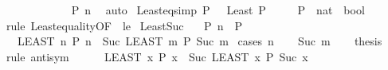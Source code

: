 \begin{isabellebody}
\ \ \ \ \isamarkupfalse%
\isanewline
\ \ \isamarkupfalse%
\isanewline
\ \ \isamarkupfalse%
\ \isamarkupfalse%
\ {\isachardoublequoteopen}P\ n{\isachardoublequoteclose}\ \isamarkupfalse%
\ auto\isanewline
{}\isamarkupfalse%
%
\endisatagproof
{\isafoldproof}%
%
\isadelimproof
\isanewline
%
\endisadelimproof
\isanewline
\isanewline
{}\isamarkupfalse%
\ Least{\isacharunderscore}{\kern0pt}eq{\isacharunderscore}{\kern0pt}{}{\isacharbrackleft}{\kern0pt}simp{\isacharbrackright}{\kern0pt}{\isacharcolon}{\kern0pt}\ {\isachardoublequoteopen}P\ {}\ {\isasymLongrightarrow}\ Least\ P\ {\isacharequal}{\kern0pt}\ {}{\isachardoublequoteclose}\isanewline
\ \ \ P\ {\isacharcolon}{\kern0pt}{\isacharcolon}{\kern0pt}\ {\isachardoublequoteopen}nat\ {\isasymRightarrow}\ bool{\isachardoublequoteclose}\isanewline
%
\isadelimproof
\ \ %
\endisadelimproof
%
\isatagproof
{}\isamarkupfalse%
\ {\isacharparenleft}{\kern0pt}rule\ Least{\isacharunderscore}{\kern0pt}equality{\isacharbrackleft}{\kern0pt}OF\ {\isacharunderscore}{\kern0pt}\ le{}{\isacharbrackright}{\kern0pt}{\isacharparenright}{\kern0pt}%
\endisatagproof
{\isafoldproof}%
%
\isadelimproof
\isanewline
%
\endisadelimproof
\isanewline
{}\isamarkupfalse%
\ Least{\isacharunderscore}{\kern0pt}Suc{\isacharcolon}{\kern0pt}\isanewline
\ \ \ {\isachardoublequoteopen}P\ n{\isachardoublequoteclose}\ {\isachardoublequoteopen}{\isasymnot}\ P\ {}{\isachardoublequoteclose}\ \isanewline
\ \ \ {\isachardoublequoteopen}{\isacharparenleft}{\kern0pt}LEAST\ n{\isachardot}{\kern0pt}\ P\ n{\isacharparenright}{\kern0pt}\ {\isacharequal}{\kern0pt}\ Suc\ {\isacharparenleft}{\kern0pt}LEAST\ m{\isachardot}{\kern0pt}\ P\ {\isacharparenleft}{\kern0pt}Suc\ m{\isacharparenright}{\kern0pt}{\isacharparenright}{\kern0pt}{\isachardoublequoteclose}\isanewline
%
\isadelimproof
%
\endisadelimproof
%
\isatagproof
{}\isamarkupfalse%
\ {\isacharparenleft}{\kern0pt}cases\ n{\isacharparenright}{\kern0pt}\isanewline
\ \ \isamarkupfalse%
\ {\isacharparenleft}{\kern0pt}Suc\ m{\isacharparenright}{\kern0pt}\isanewline
\ \ \isamarkupfalse%
\ {\isacharquery}{\kern0pt}thesis\isanewline
\ \ \isamarkupfalse%
\ {\isacharparenleft}{\kern0pt}rule\ antisym{\isacharparenright}{\kern0pt}\isanewline
\ \ \ \ \isamarkupfalse%
\ {\isachardoublequoteopen}{\isacharparenleft}{\kern0pt}LEAST\ x{\isachardot}{\kern0pt}\ P\ x{\isacharparenright}{\kern0pt}\ {\isasymle}\ Suc\ {\isacharparenleft}{\kern0pt}LEAST\ x{\isachardot}{\kern0pt}\ P\ {\isacharparenleft}{\kern0pt}Suc\ x{\isacharparenright}{\kern0pt}{\isacharparenright}{\kern0pt}{\isachardoublequoteclose}\isanewline

\end{isabellebody}
